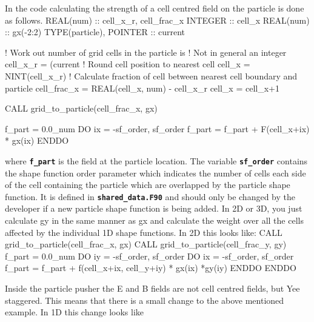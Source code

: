 \documentclass[12pt,a4paper]{article}
\newcommand{\inlinecode}[1]{{\color{warwickred} \bf\texttt{#1}}}
\newenvironment{boxverbatim}{\lboxverbatim{none}}{\endlboxverbatim}
\begin{document}
In the code calculating the strength of a cell centred field on the particle
is done as follows.
\begin{boxverbatim}
  REAL(num) :: cell_x_r, cell_frac_x
  INTEGER :: cell_x
  REAL(num) :: gx(-2:2)
  TYPE(particle), POINTER :: current

  ! Work out number of grid cells in the particle is
  ! Not in general an integer
  cell_x_r = (current%
  ! Round cell position to nearest cell
  cell_x = NINT(cell_x_r)
  ! Calculate fraction of cell between nearest cell boundary and particle
  cell_frac_x = REAL(cell_x, num) - cell_x_r
  cell_x = cell_x+1

  CALL grid_to_particle(cell_frac_x, gx)

  f_part = 0.0_num
  DO ix = -sf_order, sf_order
    f_part = f_part + F(cell_x+ix) * gx(ix)
  ENDDO
\end{boxverbatim}

where \inlinecode{f\_part} is the field at the particle location. The variable
\inlinecode{sf\_order} contains the shape function order parameter which
indicates the number of cells each side of the cell containing the particle
which are overlapped by the particle shape function. It is defined in
\inlinecode{shared\_data.F90} and should only be changed by the developer if a
new particle shape function is being added.  In 2D or 3D, you just calculate gy
in the same manner as gx and calculate the weight over all the cells affected
by the individual 1D shape functions. In 2D this looks like:
\begin{boxverbatim}
  CALL grid_to_particle(cell_frac_x, gx)
  CALL grid_to_particle(cell_frac_y, gy)
  f_part = 0.0_num
  DO iy = -sf_order, sf_order
    DO ix = -sf_order, sf_order
      f_part = f_part + f(cell_x+ix, cell_y+iy) * gx(ix) *gy(iy)
    ENDDO
  ENDDO
\end{boxverbatim}

Inside the particle pusher the E and B fields are not cell centred fields, but
Yee staggered. This means that there is a small change to the above mentioned
example. In 1D this change looks like
\end{document}
